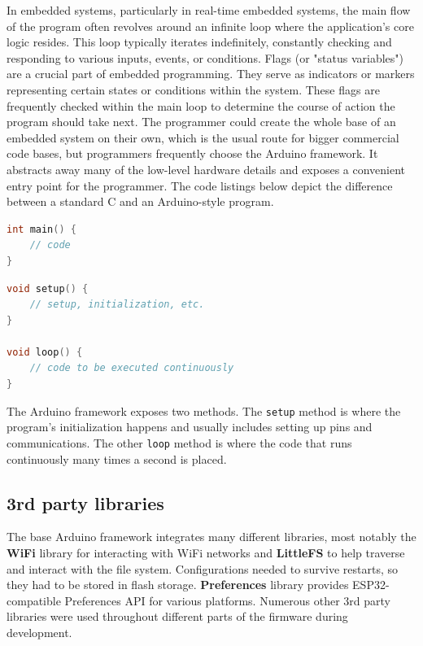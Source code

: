 \documentclass[FM,BP,EN,fonts]{tulthesis}
\begin{document}
In embedded systems, particularly in real-time embedded systems, the main flow of the program often revolves around an infinite loop where the application's core logic resides. This loop typically iterates indefinitely, constantly checking and responding to various inputs, events, or conditions. Flags (or "status variables") are a crucial part of embedded programming. They serve as indicators or markers representing certain states or conditions within the system. These flags are frequently checked within the main loop to determine the course of action the program should take next. The programmer could create the whole base of an embedded system on their own, which is the usual route for bigger commercial code bases, but programmers frequently choose the Arduino framework. It abstracts away many of the low-level hardware details and exposes a convenient entry point for the programmer. The code listings below depict the difference between a standard C and an Arduino-style program. 

\begin{lstlisting}[language=C, caption=Ordinary C program, captionpos=b]
int main() {
    // code
}
\end{lstlisting}

\begin{lstlisting}[language=C, caption=Arduino style C program, captionpos=b]
void setup() {
    // setup, initialization, etc.
}

void loop() {
    // code to be executed continuously
}
\end{lstlisting}

The Arduino framework exposes two methods. The \verb|setup| method is where the program's initialization happens and usually includes setting up pins and communications. The other \verb|loop| method is where the code that runs continuously many times a second is placed.

\subsection{3rd party libraries}
\label{subsec:3rd-party-libs}
The base Arduino framework integrates many different libraries, most notably the \textbf{WiFi} library for interacting with WiFi networks and \textbf{LittleFS} to help traverse and interact with the file system. Configurations needed to survive restarts, so they had to be stored in flash storage. \textbf{Preferences} library provides ESP32-compatible Preferences API for various platforms. Numerous other 3rd party libraries were used throughout different parts of the firmware during development.
\end{document}
